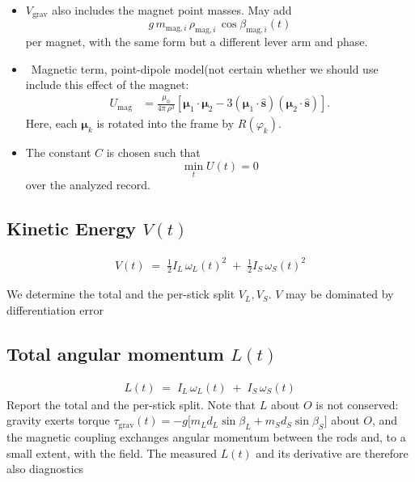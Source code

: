 \documentclass[letterpaper, 10pt, conference]{IEEEtran}
\begin{document}
            \begin{itemize}
                \item $V_{\text{grav}}$ also includes the magnet point masses. May add
                \[
                    g\,m_{\mathrm{mag},i}\,
                    \rho_{\mathrm{mag},i}\,
                    \cos\beta_{\mathrm{mag},i}(t)
                \]
                per magnet, with the same form but a different lever arm and phase.
            
                \item \  Magnetic term, point-dipole model(not certain whether we should use include this effect of the magnet:
                \begin{align}
                    U_{\text{mag}}
                    &=
                    \frac{\mu_0}{4\pi\,\rho^3}
                    \left[
                        \mathbf{\mu}_1 \cdot \mathbf{\mu}_2
                        - 3
                        \left(\mathbf{\mu}_1 \cdot \hat{\mathbf{s}}\right)
                        \left(\mathbf{\mu}_2 \cdot \hat{\mathbf{s}}\right)
                    \right].
                \end{align}
                Here, each $\mathbf{\mu}_k$ is rotated into the frame by
                $R(\varphi_k)$.
            
                \item The constant $C$ is chosen such that
                \[
                    \min_t U(t) = 0
                \]
                over the analyzed record.
            \end{itemize}

            \subsection{\textbf{Kinetic Energy $V(t)$}}
                \begin{align}
                    \,V(t) \;=\; \tfrac12 I_L\,\omega_L(t)^2 \;+\; \tfrac12 I_S\,\omega_S(t)^2\,
                \end{align}
                
                We determine the total and the per-stick split $V_L, V_S$. $V$ may be dominated by
                differentiation error

            \subsection{\textbf{Total angular momentum $L(t)$}}
                \begin{align}
                    \,L(t) \;=\; I_L\,\omega_L(t) \;+\; I_S\,\omega_S(t)\
                \end{align}
                Report the total and the per-stick split. Note that $L$ about $O$ is not
                conserved: gravity exerts torque $\tau_{\text{grav}}(t) = -g\big[m_L d_L\sin\beta_L
                + m_S d_S\sin\beta_S\big]$ about $O$, and the magnetic coupling exchanges angular
                momentum between the rods and, to a small extent, with the field. The measured
                $L(t)$ and its derivative are therefore also diagnostics %
\end{document}
